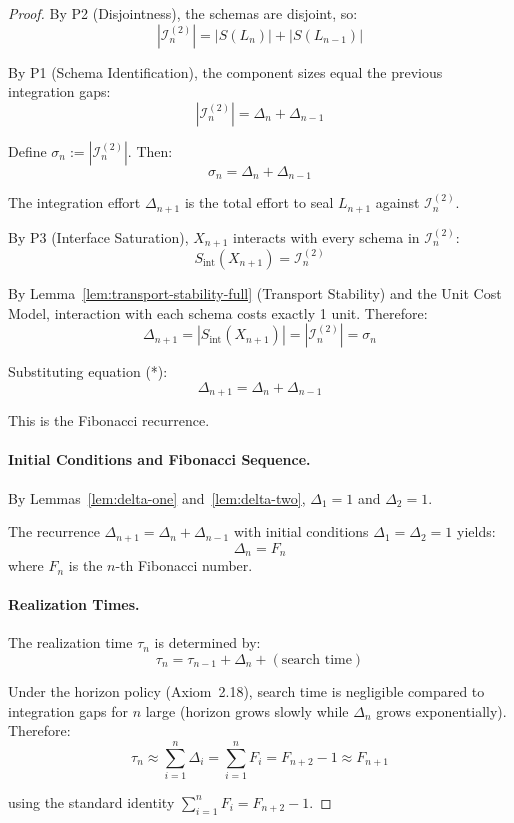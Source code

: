 \documentclass[11pt]{article}
\theoremstyle{definition}
\theoremstyle{remark}
\begin{document}
\begin{proof}
By P2 (Disjointness), the schemas are disjoint, so:
\[
|\mathcal{I}_n^{(2)}| = |S(L_n)| + |S(L_{n-1})|
\]

By P1 (Schema Identification), the component sizes equal the previous integration gaps:
\[
|\mathcal{I}_n^{(2)}| = \Delta_n + \Delta_{n-1}
\]

Define $\sigma_n := |\mathcal{I}_n^{(2)}|$. Then:
\[
\sigma_n = \Delta_n + \Delta_{n-1} \tag{*}
\]

The integration effort $\Delta_{n+1}$ is the total effort to seal $L_{n+1}$ against $\mathcal{I}_n^{(2)}$.

By P3 (Interface Saturation), $X_{n+1}$ interacts with every schema in $\mathcal{I}_n^{(2)}$:
\[
S_{\text{int}}(X_{n+1}) = \mathcal{I}_n^{(2)}
\]

By Lemma~\ref{lem:transport-stability-full} (Transport Stability) and the Unit Cost Model, interaction
with each schema costs exactly 1 unit. Therefore:
\[
\Delta_{n+1} = |S_{\text{int}}(X_{n+1})| = |\mathcal{I}_n^{(2)}| = \sigma_n
\]

Substituting equation (*):
\[
\Delta_{n+1} = \Delta_n + \Delta_{n-1}
\]

This is the Fibonacci recurrence.

\paragraph{Initial Conditions and Fibonacci Sequence.}

By Lemmas~\ref{lem:delta-one} and~\ref{lem:delta-two}, $\Delta_1 = 1$ and $\Delta_2 = 1$.

The recurrence $\Delta_{n+1} = \Delta_n + \Delta_{n-1}$ with initial conditions $\Delta_1 = \Delta_2 = 1$ yields:
\[
\Delta_n = F_n
\]
where $F_n$ is the $n$-th Fibonacci number.

\paragraph{Realization Times.}

The realization time $\tau_n$ is determined by:
\[
\tau_n = \tau_{n-1} + \Delta_n + (\text{search time})
\]

Under the horizon policy (Axiom~2.18), search time is negligible compared to integration gaps for
$n$ large (horizon grows slowly while $\Delta_n$ grows exponentially). Therefore:
\[
\tau_n \approx \sum_{i=1}^n \Delta_i = \sum_{i=1}^n F_i = F_{n+2} - 1 \approx F_{n+1}
\]

using the standard identity $\sum_{i=1}^n F_i = F_{n+2} - 1$.


\end{proof}
\end{document}
